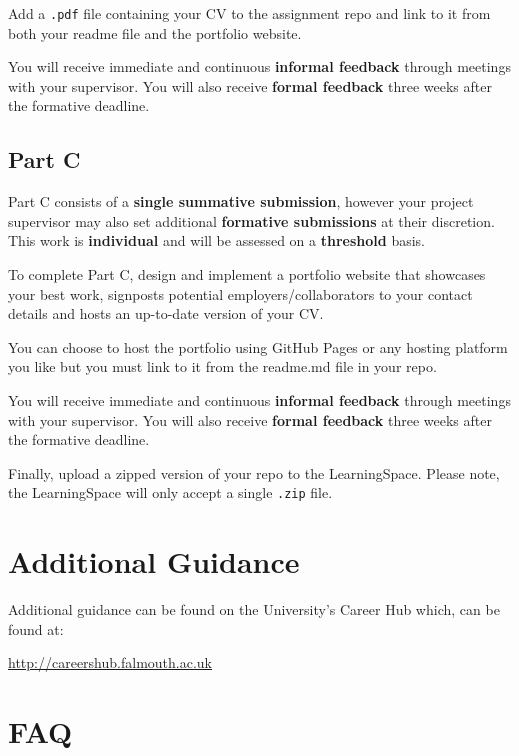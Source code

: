 \documentclass{../../fal_assignment}
\begin{document}
Add a \texttt{.pdf} file containing your CV to the assignment repo and link to it from both your readme file and the portfolio website. 

You will receive immediate and continuous \textbf{informal feedback} through meetings with your supervisor.
You will also receive \textbf{formal feedback} three weeks after the formative deadline.

\subsection*{Part C}

Part C consists of a \textbf{single summative submission},
however your project supervisor may also set additional \textbf{formative submissions} at their discretion.
This work is \textbf{individual} and will be assessed on a \textbf{threshold} basis.

To complete Part C, design and implement a portfolio website that showcases your best work, signposts potential employers/collaborators to your contact details and hosts an up-to-date version of your CV. 

You can choose to host the portfolio using GitHub Pages or any hosting platform you like but you must link to it from the readme.md file in your repo. 

You will receive immediate and continuous \textbf{informal feedback} through meetings with your supervisor.
You will also receive \textbf{formal feedback} three weeks after the formative deadline.



Finally, upload a zipped version of your repo to the LearningSpace. Please note, the LearningSpace will only accept a single \texttt{.zip} file.


\section*{Additional Guidance}

Additional guidance can be found on the University's Career Hub which, can be found at:

\url{http://careershub.falmouth.ac.uk}

\section*{FAQ}
\end{document}
